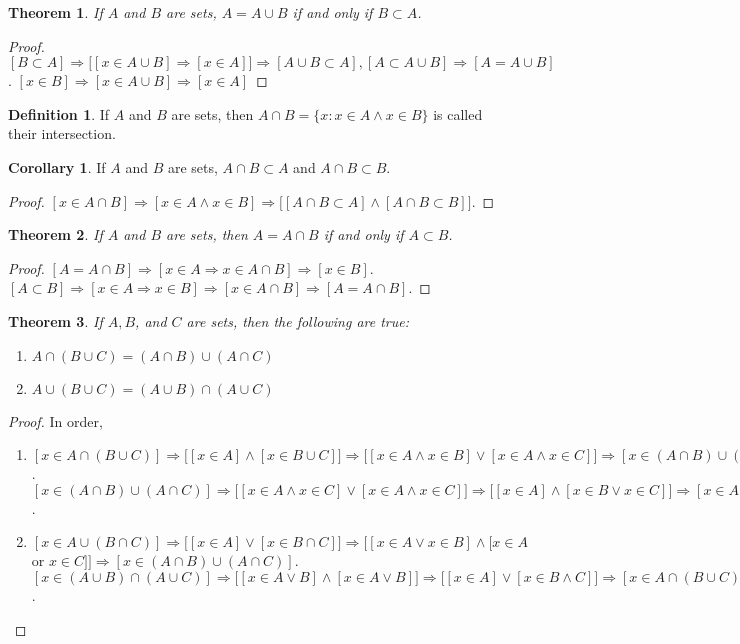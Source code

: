 \documentclass[oneside]{book}
\newtheorem{theorem}{Theorem}[section]
\theoremstyle{definition}
\newtheorem{definition}{Definition}[section]
\newtheorem{corollary}{Corollary}[section]
\begin{document}
\begin{theorem}
If $A$ and $B$ are sets, $A=A\cup B$ if and only if $B\subset A$.
\end{theorem}
\begin{proof}
$[B\subset A]\Rightarrow \big[[x\in A\cup B] \Rightarrow [x\in A]\big]\Rightarrow[A\cup B \subset A], [A\subset A\cup B]\Rightarrow[A=A\cup B]$. $[x\in B] \Rightarrow [x\in A\cup B]\Rightarrow [x\in A]$
\end{proof}

\begin{definition}
If $A$ and $B$ are sets, then $A\cap B = \{x:x\in A \land x\in B\}$ is called their intersection.
\end{definition}

\begin{corollary}
If $A$ and $B$ are sets, $A\cap B \subset A$ and $A\cap B \subset B$.
\end{corollary}
\begin{proof}
$[x\in A\cap B]\Rightarrow [x\in A\land x\in B]\Rightarrow \big[[A\cap B \subset A]\land [A\cap B \subset B]\big]$.
\end{proof}

\begin{theorem}
If $A$ and $B$ are sets, then $A=A\cap B$ if and only if $A\subset B$.
\end{theorem}
\begin{proof}
$[A=A\cap B]\Rightarrow [x\in A\Rightarrow x\in A \cap B]\Rightarrow [x\in B]$. $[A\subset B]\Rightarrow [x\in A\Rightarrow x\in B]\Rightarrow [x\in A\cap B]\Rightarrow [A=A\cap B]$.
\end{proof}

\begin{theorem}
If $A,B$, and $C$ are sets, then the following are true:
\begin{enumerate}
\item $A\cap (B\cup C) = (A\cap B)\cup (A\cap C)$
\item $A\cup (B\cup C) = (A\cup B)\cap (A\cup C)$
\end{enumerate}
\end{theorem}
\begin{proof}
In order,
\begin{enumerate}
\item $[x\in A\cap (B\cup C)]\Rightarrow \big[[x\in A] \land [x\in B\cup C]\big]\Rightarrow \big[[x\in A\land x\in B]\lor [x\in A\land x\in C]\big]\Rightarrow [x\in (A\cap B)\cup (A\cap C)]$. $[x\in (A\cap B)\cup(A\cap C)]\Rightarrow \big[[x\in A\land x\in C]\lor [x\in A \land x\in C]\big]\Rightarrow \big[[x\in A]\land [x\in B\lor x\in C]\big]\Rightarrow [x\in A\cap(B\cup C)]$.
\item $[x\in A\cup (B\cap C)]\Rightarrow \big[[x\in A]\lor [x\in B\cap C]\big] \Rightarrow \big[[x\in A \lor x\in B]\land [x\in A$ or $x\in C]\big]\Rightarrow [x\in (A\cap B)\cup (A\cap C)]$. $[x\in (A\cup B)\cap (A\cup C)]\Rightarrow \big[[x\in A\lor B]\land [x\in A\lor B]\big]\Rightarrow \big[[x\in A]\lor[x\in B\land C]\big]\Rightarrow [x\in A\cap(B\cup C)]$.
\end{enumerate}
\end{proof}
\end{document}
